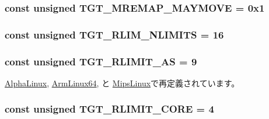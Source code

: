 \label{classLinux_aebbe098e8d7b38f0b58663068ebb2215}
\hypertarget{classLinux_adf3fd76eea9d78e56cc53f77300e1b1d}{
\subsubsection[{TGT\_\-MREMAP\_\-MAYMOVE}]{\setlength{\rightskip}{0pt plus 5cm}const unsigned {\bf TGT\_\-MREMAP\_\-MAYMOVE} = 0x1}}
\label{classLinux_adf3fd76eea9d78e56cc53f77300e1b1d}
\hypertarget{classLinux_a2156324051ade9812d3df5b805264862}{
\subsubsection[{TGT\_\-RLIM\_\-NLIMITS}]{\setlength{\rightskip}{0pt plus 5cm}const unsigned {\bf TGT\_\-RLIM\_\-NLIMITS} = 16}}
\label{classLinux_a2156324051ade9812d3df5b805264862}
\hypertarget{classLinux_a6e372e5f43e2da816e9bbf5088d89c21}{
\subsubsection[{TGT\_\-RLIMIT\_\-AS}]{\setlength{\rightskip}{0pt plus 5cm}const unsigned {\bf TGT\_\-RLIMIT\_\-AS} = 9}}
\label{classLinux_a6e372e5f43e2da816e9bbf5088d89c21}


\hyperlink{classAlphaLinux_a6e372e5f43e2da816e9bbf5088d89c21}{AlphaLinux}, \hyperlink{classArmLinux64_a599454267926920de3bd5a488bda3e03a3f118b58936b90cf8382d441ef567c39}{ArmLinux64}, と \hyperlink{classMipsLinux_a6e372e5f43e2da816e9bbf5088d89c21}{MipsLinux}で再定義されています。\hypertarget{classLinux_ae30241d39abfaa273c33b7ea312069e8}{
\subsubsection[{TGT\_\-RLIMIT\_\-CORE}]{\setlength{\rightskip}{0pt plus 5cm}const unsigned {\bf TGT\_\-RLIMIT\_\-CORE} = 4}}
\label{classLinux_ae30241d39abfaa273c33b7ea312069e8}


